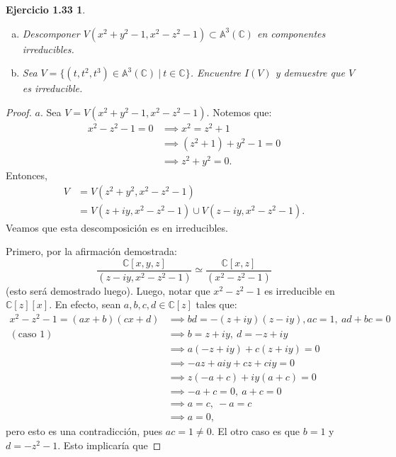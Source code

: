 \documentclass{amsart}
\theoremstyle{plain}
\newtheorem*{ejercicio1}{Ejercicio 1.33}
\newcommand{\C}{\mathbb{C}}
\begin{document}
	\begin{ejercicio1}
		\begin{enumerate}[(a)]
			\item Descomponer $V(x^{2} + y^{2} - 1, x^{2} - z^{2} - 1) \subset \mathbb{A}^{3}(\C)$ en componentes irreducibles.

			\item Sea $V = \{(t,t^{2},t^{3}) \in \mathbb{A}^{3}(\C) \ | \ t \in \C\}$. Encuentre $I(V)$ y demuestre que $V$ es irreducible. 
		\end{enumerate}
	\end{ejercicio1}
	\begin{proof}
		$\boxed{a.}$ Sea $V = V(x^{2} + y^{2} - 1, x^{2} - z^{2} - 1)$. Notemos que:
		\begin{align*}
			x^{2} - z^{2} - 1 = 0 &\implies x^{2} = z^{2} + 1 \\
			&\implies (z^{2} + 1) + y^{2} - 1 = 0 \\
			&\implies z^{2} + y^{2} = 0
		.\end{align*}
		Entonces,
		\begin{align*}
			V &= V(z^{2} + y^{2}, x^{2} - z^{2} - 1) \\
			&= V(z + iy, x^{2} - z^{2} - 1) \cup V(z - iy, x^{2} - z^{2} - 1)
		.\end{align*}
		Veamos que esta descomposición es en irreducibles. \par
		Primero, por la afirmación demostrada:
		\[ \frac{\C[x,y,z]}{(z - iy, x^{2} - z^{2} - 1)} \simeq \frac{\C[x,z]}{(x^{2} - z^{2} - 1)} \]
		(esto será demostrado luego). Luego, notar que $x^{2} - z^{2} - 1$ es irreducible en $\C[z][x]$. En efecto, sean $a,b,c,d \in \C[z]$ tales que:
		\begin{align*}
			x^{2} - z^{2} - 1 = (ax + b)(cx + d) &\implies bd = -(z + iy)(z - iy), ac = 1,\ ad + bc = 0 \\
			(\text{caso 1}) &\implies b = z + iy,\ d = -z + iy \\
			&\implies a(-z + iy) + c(z + iy) = 0 \\
			&\implies -az + aiy + cz + ciy = 0 \\
			&\implies z(-a + c) + iy(a + c) = 0 \\
			&\implies -a + c = 0,\ a + c = 0 \\
			&\implies a = c,\ -a = c \\
			&\implies a = 0
		,\end{align*}
		pero esto es una contradicción, pues $ac = 1 \neq 0$. El otro caso es que $b = 1$ y $d = -z^{2} - 1$. Esto implicaría que

\end{proof}
\end{document}
